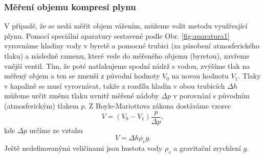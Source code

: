 \documentclass[english]{article}
\begin{document}
			\subsubsection{Měření objemu kompresí plynu}
					V případě, že se nedá měřit objem vážením, můžeme volit metodu využívající plynu. Pomocí speciální aparatury sestavené podle Obr. \ref{fig:aparatura1} vyrovnáme hladiny vody v byretě a pomocné trubici (za působení atmosferického tlaku) a následně ramenu, které vede do měřeného objemu (byretou), zavřeme vnější ventil. Tím, že poté natlakujeme spodní nádrž s vodou, zvýšíme tlak na měřený objem a ten se zmenší z původní hodnoty $V_0$ na novou hodnotu $V_1$. Tlaky v kapalině se musí vyrovnávat, takže z rozdílu hladin v obou trubicích $\Delta h$ můžeme určit změnu tlaku uvnitř měřené nádoby $\Delta p$ v porovnání s původním (atmosferickým) tlakem $p$. Z Boyle-Mariottova zákona dostáváme vzorec 
					\begin{equation}\label{eq:objem_komprese}
						V = (V_0-V_1)\frac{p}{\Delta p},
					\end{equation}		 
					kde $\Delta p$ určíme ze vztahu 
					\begin{equation}\label{eq:objem_Delta_p}
						V =  \Delta h \rho_v g.
					\end{equation}		
					Ještě nedefinovanými veličinami jsou hustota vody $\rho_v$ a gravitační zrychlení $g$.
					 
\end{document}
